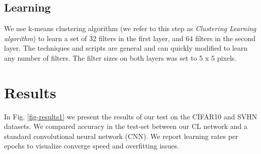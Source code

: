 \documentclass{article} %
\begin{document}
\subsection{Learning}
We use k-means clustering algorithm (we refer to this step as \textit{Clustering Learning algorithm}) to learn a set of 32 filters in the first layer, and 64 filters in the second layer. The techniques and scripts are general and can quickly modified to learn any number of filters. The filter sizes on both layers was set to 5 x 5 pixels.









\section{Results}
\label{sec-results}

In Fig. \ref{fig-results1} we present the results of our test on the CIFAR10 and SVHN datasets. We compared accuracy in the test-set between our CL network and a standard convolutional neural network (CNN). We report learning rates per epochs to visualize converge speed and overfitting issues.
\end{document}
